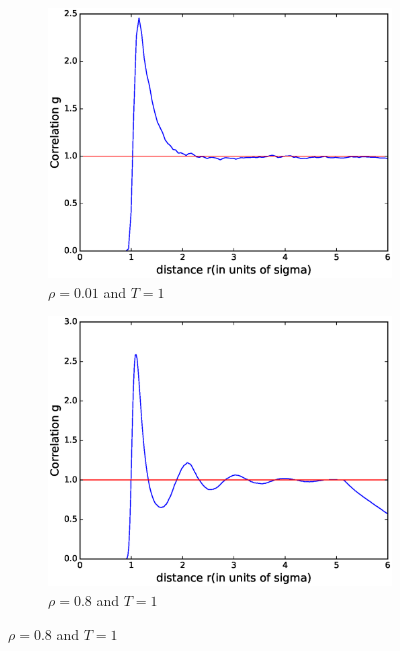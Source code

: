 \documentclass[twoside]{article}
\begin{document}
\begin{figure}
	\begin{subfigure}[b]{0.48\textwidth}
	\centering
	\includegraphics[width=0.9\linewidth]{fig/figure_corr_gas2.eps}
	\caption{$\rho = 0.01$ and $T = 1$}
	\label{fig:figure_corr_gas}
	\end{subfigure}
	\begin{subfigure}[b]{0.48\textwidth}
		\centering
		\includegraphics[width=0.9\linewidth]{fig/figure_corr_gas.eps}
		\caption{$\rho = 0.8$ and $T = 1$}
		\label{fig:figure_corr_liquid}
	\end{subfigure}
	

\end{figure}
\end{document}
